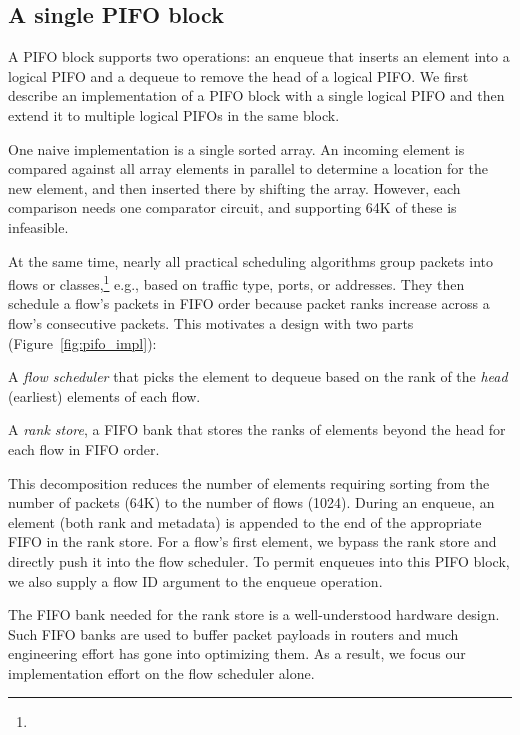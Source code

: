 \subsection{A single PIFO block}
\label{ss:single_block}

A PIFO block supports two operations: an enqueue that inserts an
element into a logical PIFO and a dequeue to remove the head of a
logical PIFO.  We first describe an implementation of a PIFO block with a
single logical PIFO and then extend it to multiple logical PIFOs in the same
block.

One naive implementation is a single sorted array. An incoming element is
compared against all array elements in parallel to determine a location for the
new element, and then inserted there by shifting the array.  However, each
comparison needs one comparator circuit, and supporting 64K of
these is infeasible.

At the same time, nearly all practical scheduling algorithms group packets into
flows or classes,\footnote{} e.g., based on
traffic type, ports, or addresses. They then schedule a flow's packets in FIFO
order because packet ranks increase across a flow's consecutive packets.  This
motivates a design with two parts (Figure~\ref{fig:pifo_impl}):
\begin{CompactEnumerate}
\item A {\em flow scheduler} that picks the element to dequeue based on the rank of the {\em
head} (earliest) elements of each flow. 
\item A {\em rank store}, a FIFO bank that stores the ranks of
  elements beyond the head for each flow in FIFO order.
\end{CompactEnumerate}

This decomposition reduces the number of elements requiring sorting from the
number of packets (64K) to the number of flows (1024). During an enqueue, an
element (both rank and metadata) is appended to the end of the appropriate FIFO
in the rank store. For a flow's first element, we bypass the rank store and
directly push it into the flow scheduler. To permit enqueues into this PIFO
block, we also supply a flow ID argument to the enqueue operation.

The FIFO bank needed for the rank store is a well-understood hardware
design. Such FIFO banks are used to buffer packet payloads in routers and
much engineering effort has gone into optimizing them.  As a result,
we focus our implementation effort on the flow scheduler alone.

